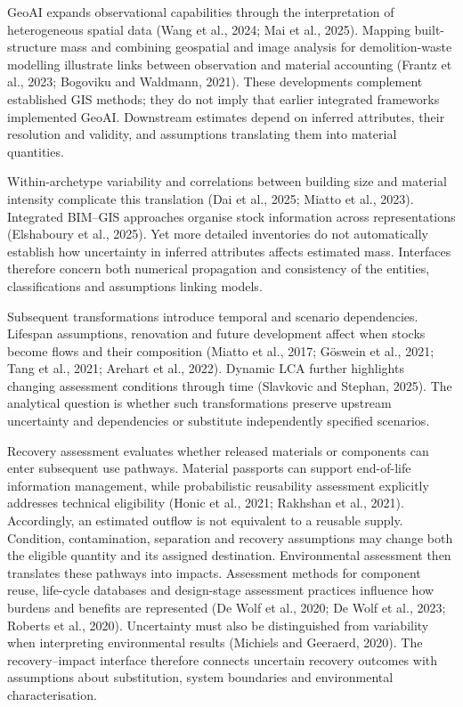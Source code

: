 GeoAI expands observational capabilities through the interpretation of heterogeneous spatial data (Wang et al., 2024; Mai et al., 2025). Mapping built-structure mass and combining geospatial and image analysis for demolition-waste modelling illustrate links between observation and material accounting (Frantz et al., 2023; Bogoviku and Waldmann, 2021). These developments complement established GIS methods; they do not imply that earlier integrated frameworks implemented GeoAI. Downstream estimates depend on inferred attributes, their resolution and validity, and assumptions translating them into material quantities.

Within-archetype variability and correlations between building size and material intensity complicate this translation (Dai et al., 2025; Miatto et al., 2023). Integrated BIM--GIS approaches organise stock information across representations (Elshaboury et al., 2025). Yet more detailed inventories do not automatically establish how uncertainty in inferred attributes affects estimated mass. Interfaces therefore concern both numerical propagation and consistency of the entities, classifications and assumptions linking models.

Subsequent transformations introduce temporal and scenario dependencies. Lifespan assumptions, renovation and future development affect when stocks become flows and their composition (Miatto et al., 2017; Göswein et al., 2021; Tang et al., 2021; Arehart et al., 2022). Dynamic LCA further highlights changing assessment conditions through time (Slavkovic and Stephan, 2025). The analytical question is whether such transformations preserve upstream uncertainty and dependencies or substitute independently specified scenarios.

Recovery assessment evaluates whether released materials or components can enter subsequent use pathways. Material passports can support end-of-life information management, while probabilistic reusability assessment explicitly addresses technical eligibility (Honic et al., 2021; Rakhshan et al., 2021). Accordingly, an estimated outflow is not equivalent to a reusable supply. Condition, contamination, separation and recovery assumptions may change both the eligible quantity and its assigned destination. Environmental assessment then translates these pathways into impacts. Assessment methods for component reuse, life-cycle databases and design-stage assessment practices influence how burdens and benefits are represented (De Wolf et al., 2020; De Wolf et al., 2023; Roberts et al., 2020). Uncertainty must also be distinguished from variability when interpreting environmental results (Michiels and Geeraerd, 2020). The recovery--impact interface therefore connects uncertain recovery outcomes with assumptions about substitution, system boundaries and environmental characterisation.

